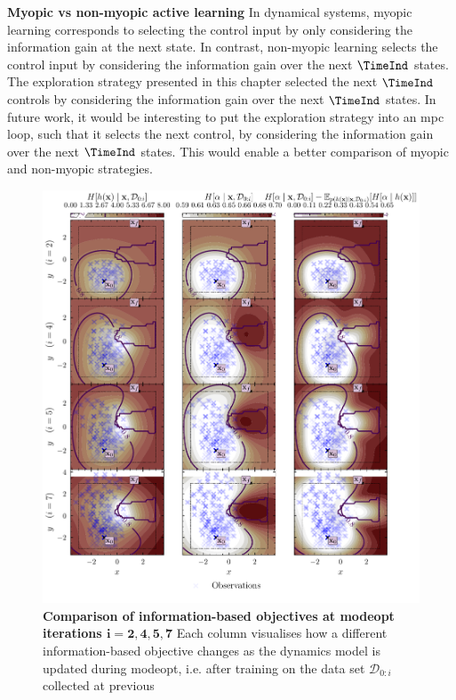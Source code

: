 \documentclass{mimosis-class/mimosis}
\numberwithin{equation}{chapter}
\newcommand{\dataset}{\ensuremath{\mathcal{D}}}
\begin{document}
{\textbf{Myopic vs non-myopic active learning}
In dynamical systems, myopic learning corresponds to selecting the control input by only considering the information gain
at the next state.
In contrast, non-myopic learning selects the control input by considering the
information gain over the next \(\TimeInd\) states.
The exploration strategy presented in this chapter selected the next \(\TimeInd\) controls by considering
the information gain over the next \(\TimeInd\) states.
In future work, it would be interesting to put the exploration strategy into an \acrshort{mpc} loop, such that it
selects the next control, by considering the information gain over the next \(\TimeInd\) states.
This would enable a better comparison of myopic and non-myopic strategies.
\begin{figure}
\centering
\includegraphics[width=\textwidth]{./images/mode-opt/exploration/entropy_comparison_iterations_2_to_7.pdf}
\caption[Comparison of information-based objectives at \acrshort{modeopt} iterations $\mathbf{i=2, 4, 5, 7}$]{\textbf{Comparison of information-based objectives at \acrshort{modeopt} iterations $\mathbf{i=2, 4, 5, 7}$}
Each column visualises how a different information-based objective changes as the
dynamics model is updated during \acrshort{modeopt}, i.e. after training on the data set $\dataset_{0:i}$ collected at previous
}
\end{figure}}
\end{document}

